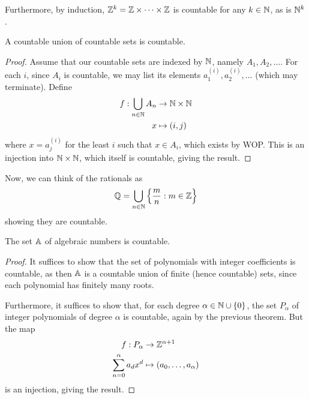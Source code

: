 \documentclass{../../template/note}
\begin{document}
    Furthermore, by induction, \(\ZZ^k = \ZZ \times \cdots \times \ZZ\) is countable for any \(k \in \NN\), as is \(\NN^k\).
    
    \begin{theorem}
        \label{countable-union}
        A countable union of countable sets is countable.
    \end{theorem}
    
    \begin{proof}
        Assume that our countable sets are indexed by \(\NN\), namely \(A_1, A_2, \dots\). For each \(i\), since \(A_i\) is countable, we may list its elements \(a_1^{(i)}, a_2^{(i)}, \dots\) (which may terminate). Define
        \begin{align*}
            f: \bigcup_{n \in \NN} A_n &\to \NN \times \NN \\
            x &\mapsto (i, j)
        \end{align*}
        where \(x = a_j^{(i)}\) for the least \(i\) such that \(x \in A_i\), which exists by WOP. This is an injection into \(\NN \times \NN\), which itself is countable, giving the result.
    \end{proof}
    
    Now, we can think of the rationals as
    \begin{align*}
        \QQ = \bigcup_{n \in \NN} \left\{\frac m n : m \in \ZZ\right\}
    \end{align*}
    showing they are countable.
    
    \begin{theorem}
        The set \(\AA\) of algebraic numbers is countable.
    \end{theorem}
    
    \begin{proof}
        It suffices to show that the set of polynomials with integer coefficients is countable, as then \(\AA\) is a countable union of finite (hence countable) sets, since each polynomial has finitely many roots.

        Furthermore, it suffices to show that, for each degree \(\alpha \in \NN \cup \{0\}\), the set \(P_\alpha\) of integer polynomials of degree \(\alpha\) is countable, again by the previous theorem. But the map
        \begin{align*}
            f: P_\alpha &\to \ZZ^{\alpha+1} \\
            \sum_{n=0}^\alpha a_dx^d &\mapsto (a_0, \dots, a_\alpha)
        \end{align*}
        is an injection, giving the result.
    \end{proof}
    
\end{document}
